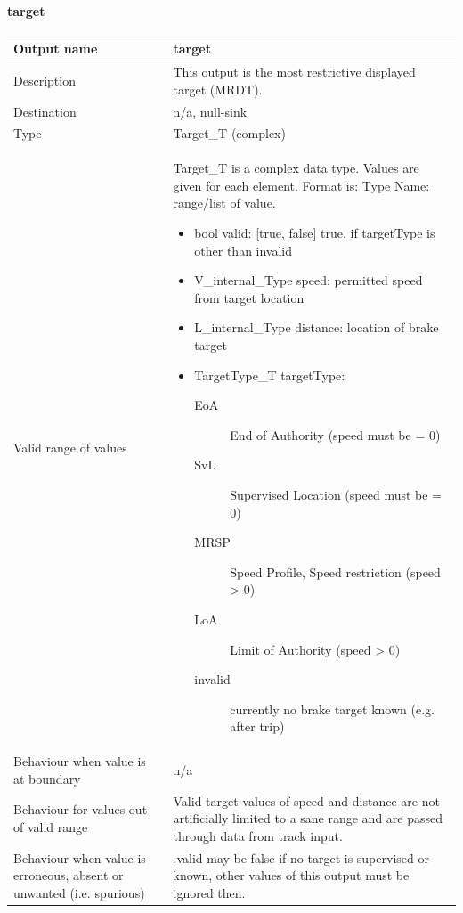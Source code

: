 \paragraph{target}\label{p:SDM_target}

\begin{longtable}{p{}p{}}
\toprule
Output name				& target \\
\midrule
Description				& This output is the most restrictive displayed target (MRDT). \\
\midrule
Destination				& n/a, null-sink \\ 
\midrule
Type					& Target\_T (complex)\\
\midrule
Valid range of values	& Target\_T is a complex data type. Values are given for each element. Format is: Type Name: range/list of value.
\begin{itemize}
\item bool valid: [true, false] true, if targetType is other than invalid
\item V\_internal\_Type speed: permitted speed from target location
\item L\_internal\_Type distance: location of brake target
\item TargetType\_T targetType:
\begin{description}
\item[EoA] End of Authority (speed must be = 0)
\item[SvL] Supervised Location (speed must be = 0)
\item[MRSP] Speed Profile, Speed restriction (speed > 0)
\item[LoA] Limit of Authority (speed > 0)
\item[invalid] currently no brake target known (e.g. after trip)
\end{description}
\end{itemize}\\
\midrule
Behaviour when value is at boundary	& n/a \\
\midrule
Behaviour for values out of valid range	& Valid target values of speed and distance are not artificially limited to a sane range and are passed through data from track input.\\
\midrule
Behaviour when value is erroneous, absent or unwanted (i.e. spurious) & .valid may be false if no target is supervised or known, other values of this output must be ignored then. \\
\bottomrule
\end{longtable}


